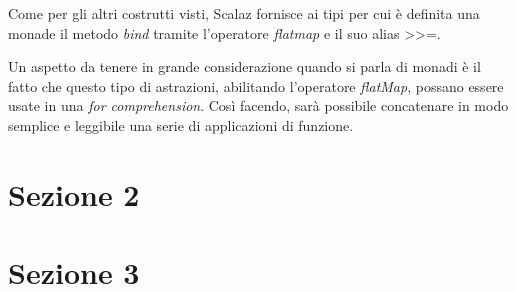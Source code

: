 Come per gli altri costrutti visti, Scalaz fornisce ai tipi per cui è definita una monade il metodo \textit{bind} tramite l'operatore \textit{flatmap} e il suo alias >>=.



Un aspetto da tenere in grande considerazione quando si parla di monadi è il fatto che questo tipo di astrazioni, abilitando l'operatore \textit{flatMap}, possano essere usate in una \textit{for comprehension}. Così facendo, sarà possibile concatenare in modo semplice e leggibile una serie di applicazioni di funzione.




\section{Sezione 2}


\section{Sezione 3}
